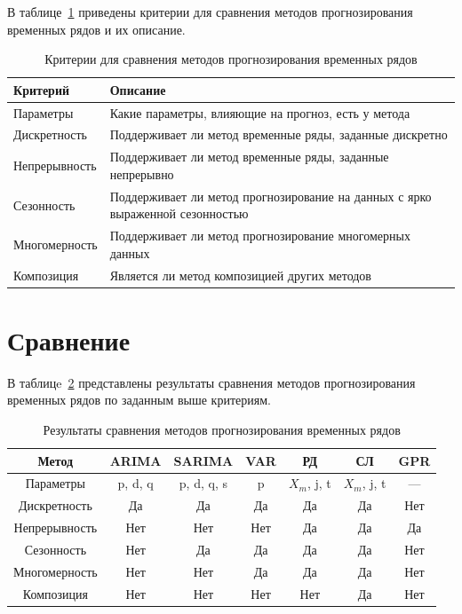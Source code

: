 \documentclass[a4paper, 14pt]{extreport}
\begin{document}
В таблице~\ref{tbl:crits} приведены критерии для сравнения методов прогнозирования временных рядов и их описание.
\begin{table}[h]
\begin{center}
\caption{\label{tbl:crits} Критерии для сравнения методов прогнозирования временных рядов}
\begin{tabular}{| p{4cm} | p{12cm} |}
\hline
Критерий  & Описание \\
\hline
Параметры & Какие параметры, влияющие на прогноз, есть у метода \\
\hline
Дискретность & Поддерживает ли метод временные ряды, заданные дискретно \\
\hline
Непрерывность & Поддерживает ли метод временные ряды, заданные непрерывно \\
\hline
Сезонность & Поддерживает ли метод прогнозирование на данных с ярко выраженной сезонностью \\
\hline
Многомерность & Поддерживает ли метод прогнозирование многомерных данных \\
\hline
Композиция & Является ли метод композицией других методов \\
\hline
\end{tabular}
\end{center}
\end{table}

\section{Сравнение}

В таблицe~\ref{tbl:compare_res} представлены результаты сравнения методов прогнозирования временных рядов по заданным 
выше критериям.
\begin{table}[h]
	\begin{center}
	\caption{\label{tbl:compare_res} Результаты сравнения методов прогнозирования временных рядов}
	\begin{tabular}{|c|c|c|c|c|c|c|}
		\hline
		Метод & ARIMA & SARIMA & VAR & РД & СЛ & GPR \\
		\hline
		Параметры & p, d, q & p, d, q, s & p & $X_m$, j, t & $X_m$, j, t & --- \\
		\hline
		Дискретность & Да & Да & Да & Да & Да & Нет \\
		\hline
		Непрерывность & Нет & Нет & Нет & Да & Да & Да \\
		\hline
		Сезонность & Нет & Да & Да & Да & Да & Нет \\
		\hline
		Многомерность & Нет & Нет & Да & Да & Да & Нет \\
		\hline
		Композиция & Нет & Нет & Нет & Нет & Да & Нет \\
		\hline
	\end{tabular}
	\end{center}
\end{table}
\end{document}
